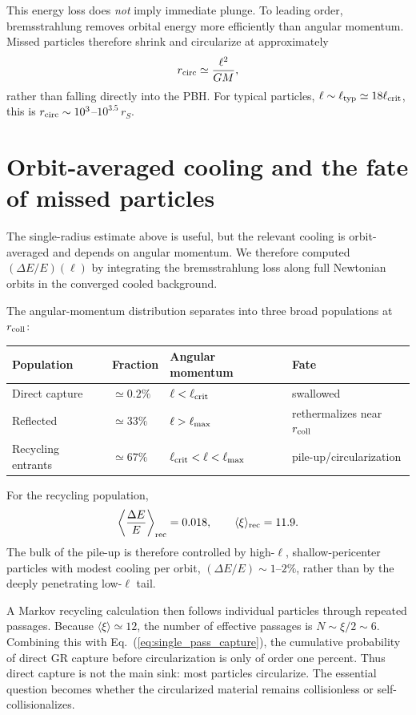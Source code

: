 \documentclass[12pt]{article}
\newcommand{\rcoll}{r_{\rm coll}}
\newcommand{\lcrit}{\ell_{\rm crit}}
\newcommand{\ltyp}{\ell_{\rm typ}}
\begin{document}
This energy loss does \emph{not} imply immediate plunge. To leading
order, bremsstrahlung removes orbital energy more efficiently than
angular momentum. Missed particles therefore shrink and circularize at
approximately
\begin{equation}
  r_{\rm circ}\simeq\frac{\ell^2}{GM},
\end{equation}
rather than falling directly into the PBH. For typical particles,
$\ell\sim\ltyp\simeq18\lcrit$, this is
$r_{\rm circ}\sim10^3$--$10^{3.5}\,r_S$.

\section{Orbit-averaged cooling and the fate of missed particles}
\label{app:orbit_averaged}

The single-radius estimate above is useful, but the relevant cooling is
orbit-averaged and depends on angular momentum. We therefore computed
$(\Delta E/E)(\ell)$ by integrating the bremsstrahlung loss along full
Newtonian orbits in the converged cooled background.

The angular-momentum distribution separates into three broad
populations at $\rcoll$:
\begin{center}
\begin{tabular}{llll}
\toprule
Population & Fraction & Angular momentum & Fate \\
\midrule
Direct capture & $\simeq0.2\%$ & $\ell<\lcrit$ & swallowed \\
Reflected & $\simeq33\%$ & $\ell>\ell_{\rm max}$ & rethermalizes near $\rcoll$ \\
Recycling entrants & $\simeq67\%$ & $\lcrit<\ell<\ell_{\rm max}$ & pile-up/circularization \\
\bottomrule
\end{tabular}
\end{center}
For the recycling population,
\begin{equation}
  \left\langle \frac{\Delta E}{E}\right\rangle_{\rm rec}=0.018,
  \qquad
  \langle\xi\rangle_{\rm rec}=11.9.
  \label{eq:orbit_average_results}
\end{equation}
The bulk of the pile-up is therefore controlled by high-$\ell$,
shallow-pericenter particles with modest cooling per orbit,
$(\Delta E/E)\sim1$--$2\%$, rather than by the deeply penetrating
low-$\ell$ tail.

A Markov recycling calculation then follows individual particles
through repeated passages. Because $\langle\xi\rangle\simeq12$, the
number of effective passages is $N\sim\xi/2\sim6$. Combining this with
Eq.~(\ref{eq:single_pass_capture}), the cumulative probability of
direct GR capture before circularization is only of order one percent.
Thus direct capture is not the main sink: most particles circularize.
The essential question becomes whether the circularized material remains
collisionless or self-collisionalizes.
\end{document}
